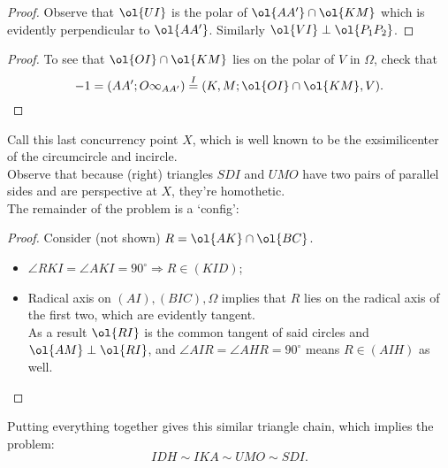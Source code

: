 \documentclass{seto}
\begin{document}
\begin{proof}Observe that $\ol{UI}$ is the polar of $\ol{AA'}\cap\ol{KM}$ which
is evidently perpendicular to $\ol{AA'}$. Similarly $\ol{VI}\perp\ol{P_1P_2}$.
\end{proof}
\begin{proof}
To see that $\ol{OI}\cap\ol{KM}$ lies on the polar of $V$ in $\Omega$, check that
\[-1=(AA';O\infty_{AA'})\overset I=(K,M;\ol{OI}\cap\ol{KM},V).\qedhere\]
\end{proof}
Call this last concurrency point $X$, 
which is well known to be the exsimilicenter of the circumcircle and incircle.\\[4pt]
Observe that because (right) triangles $SDI$ and $UMO$ have 
two pairs of parallel sides and are perspective at $X$,
they're homothetic.\\
The remainder of the problem is a `config':
\begin{proof}Consider (not shown) $R=\ol{AK}\cap\ol{BC}$.
\begin{itemize}
\item $\angle RKI=\angle AKI=90^\circ\Rightarrow R\in(KID)$;
\item Radical axis on $(AI),(BIC),\Omega$ implies that 
$R$ lies on the radical axis of the first two, which are evidently tangent.\\
As a result $\ol{RI}$ is the common tangent of said circles and $\ol{AM}\perp\ol{RI}$,
and $\angle AIR=\angle AHR=90^\circ$ means $R\in(AIH)$ as well.
\end{itemize}
\end{proof}
Putting everything together gives this similar triangle chain, which 
implies the problem:
\[IDH\sim IKA\sim UMO\sim SDI.\]
\end{document}
